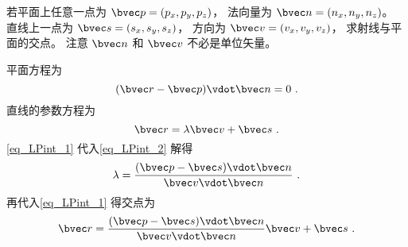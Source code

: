 

若平面上任意一点为 $\bvec p = (p_x, p_y, p_z)$， 法向量为 $\bvec n = (n_x, n_y, n_z)$。 直线上一点为 $\bvec s = (s_x, s_y, s_z)$， 方向为 $\bvec v = (v_x, v_y, v_z)$， 求射线与平面的交点。 注意 $\bvec n$ 和 $\bvec v$ 不必是单位矢量。

平面方程为
\begin{equation}\label{eq_LPint_2}
(\bvec r - \bvec p) \vdot \bvec n = 0~.
\end{equation}
直线的参数方程为
\begin{equation}\label{eq_LPint_1}
\bvec r = \lambda \bvec v + \bvec s~.
\end{equation}
\autoref{eq_LPint_1} 代入\autoref{eq_LPint_2} 解得
\begin{equation}
\lambda = \frac{(\bvec p - \bvec s)\vdot \bvec n}{\bvec v \vdot \bvec n}~.
\end{equation}
再代入\autoref{eq_LPint_1} 得交点为
\begin{equation}\label{eq_LPint_3}
\bvec r = \frac{(\bvec p - \bvec s)\vdot \bvec n}{\bvec v \vdot \bvec n} \bvec v + \bvec s~.
\end{equation}

